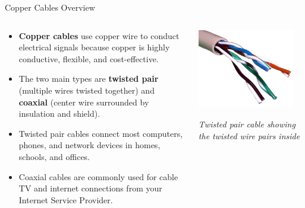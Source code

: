 \documentclass[aspectratio=169]{beamer}
\begin{document}
\begin{frame}{Copper Cables Overview}
    \begin{columns}[T]
        \begin{column}{0.55\textwidth}
            \begin{itemize}
                \item \textbf{Copper cables} use copper wire to conduct electrical signals because copper is highly conductive, flexible, and cost-effective.
                \item The two main types are \textbf{twisted pair} (multiple wires twisted together) and \textbf{coaxial} (center wire surrounded by insulation and shield).
                \item Twisted pair cables connect most computers, phones, and network devices in homes, schools, and offices.
                \item Coaxial cables are commonly used for cable TV and internet connections from your Internet Service Provider.
            \end{itemize}
        \end{column}
        \begin{column}{0.4\textwidth}
            \centering
            \includegraphics[width=0.9\textwidth]{UTP_cable_w_twists_showing.jpg}
            \vspace{0.2cm}
            
            \small{\textit{Twisted pair cable showing the twisted wire pairs inside}}
        \end{column}
    \end{columns}
\end{frame}
\end{document}
